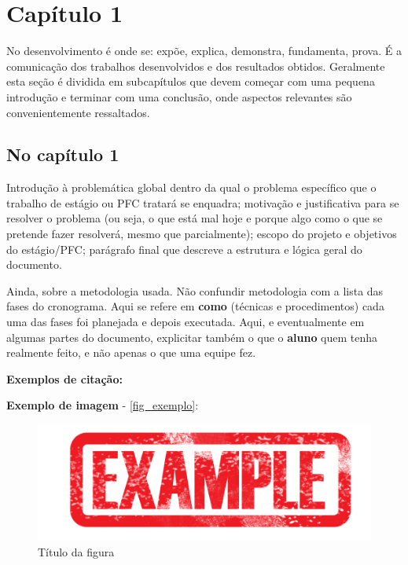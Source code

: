 \chapter{Capítulo 1}

No desenvolvimento é onde se: expõe, explica, demonstra, fundamenta, prova. É a comunicação dos trabalhos desenvolvidos e dos resultados obtidos. Geralmente esta seção é dividida em subcapítulos que devem começar com uma pequena introdução e terminar com uma conclusão, onde aspectos relevantes são convenientemente ressaltados.

\section{No capítulo 1}

Introdução à problemática global dentro da qual o problema específico que o trabalho de estágio ou PFC tratará se enquadra; motivação e justificativa para se resolver o problema (ou seja, o que está mal hoje e porque algo como o que se pretende fazer resolverá, mesmo que parcialmente); escopo do projeto e objetivos do estágio/PFC; parágrafo final que descreve a estrutura e lógica geral do documento.

Ainda, sobre a metodologia usada. Não confundir metodologia com a lista das fases do cronograma. Aqui se refere em \textbf{como} (técnicas e procedimentos) cada uma das fases foi planejada e depois executada. Aqui, e eventualmente em algumas partes do documento, explicitar também o que o \textbf{aluno} quem tenha realmente feito, e não apenas o que uma equipe fez.

\textbf{Exemplos de citação:}

\cite{van86}


\textbf{Exemplo de imagem} - \autoref{fig_exemplo}:

\begin{figure}[htb]
	\caption{\label{fig_exemplo}Título da figura}
	\begin{center}
	    \includegraphics[scale=0.2]{imagens/Example.png}
	\end{center}
\end{figure}